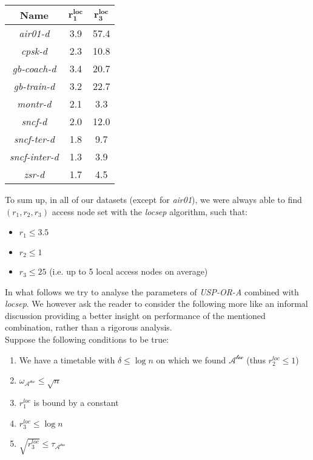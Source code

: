 		\begin{table}[h]
			\centering 
			\begin{tabular}{c|c|c}
				\rowcolor{tablehead}
				\textbf{Name} & $\bm{r^{loc}_{1}}$ & $\bm{r^{loc}_{3}}$ \\
				\hline
				\textit{air01-d} & 3.9 & 57.4 \\
				\textit{cpsk-d} & 2.3 & 10.8 \\
				\textit{gb-coach-d} & 3.4 & 20.7 \\
				\textit{gb-train-d} & 3.2 & 22.7 \\
				\textit{montr-d} & 2.1 & 3.3 \\
				\textit{sncf-d} & 2.0 & 12.0 \\
				\textit{sncf-ter-d} & 1.8 & 9.7 \\
				\textit{sncf-inter-d} & 1.3 & 3.9 \\
				\textit{zsr-d} & 1.7 & 4.5 \\
			\end{tabular}
			\label{tab:locsep}
		\end{table}					
		
		\noindent To sum up, in all of our datasets (except for \textit{air01}), we were always able to find $(r_{1}, r_{2}, r_{3})$ access node set with the \textit{locsep} algorithm, such that:
		\begin{itemize}
			\item $r_{1} \leq 3.5$
			\item $r_{2} \leq 1$
			\item $r_{3} \leq 25$ (i.e. up to 5 local access nodes on average)
		\end{itemize}
		\hspace*{\fill}		
		
		\noindent In what follows we try to analyse the parameters of \textit{USP-OR-A} combined with \textit{locsep}. We however ask the reader to consider the following more like an informal discussion providing a better insight on performance of the mentioned combination, rather than a rigorous analysis. \\
		
		\noindent Suppose the following conditions to be true:
		\begin{enumerate}
			\item We have a timetable with $\delta \leq \log n$ on which we found $\mathcal{A^{loc}}$ (thus $r_{2}^{loc} \leq 1$)
			\item $\omega_{\mathcal{A^{loc}}} \leq \sqrt{n}$
			\item $r_{1}^{loc}$ is bound by a constant
			\item $r_{3}^{loc} \leq \log n$
			\item $\sqrt{r_{3}^{loc}} \leq \tau_{\mathcal{A^{loc}}}$
		\end{enumerate}
		\hspace{\fill}
		
